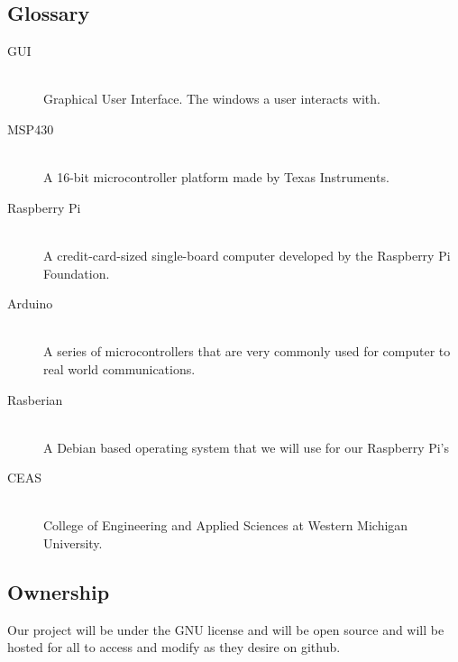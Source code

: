 \documentclass{report}
\begin{document}
\subsection*{Glossary}
\begin{description}
\item [GUI] \hfill \\
Graphical User Interface. The windows a user interacts with.
\item [MSP430] \hfill \\
A 16-bit microcontroller platform made by Texas Instruments.
\item [Raspberry Pi] \hfill \\
 A credit-card-sized single-board computer developed by the Raspberry Pi Foundation.
\item [Arduino] \hfill \\
A series of microcontrollers that are very commonly used for computer to real world communications.
\item [Rasberian] \hfill \\
 A Debian based operating system that we will use for our Raspberry Pi’s
\item [CEAS] \hfill \\
College of Engineering and Applied Sciences at Western Michigan University.
\end{description}
\newpage
\subsection*{Ownership}
	Our project will be under the GNU license and will be open source and will be hosted for all to access and modify as they desire on github.
\end{document}
